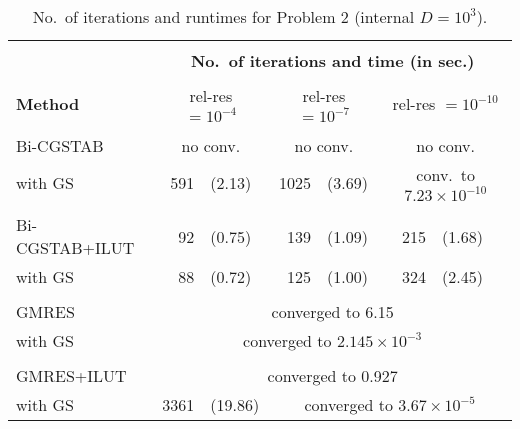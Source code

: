 \documentclass[12pt,a4paper]{article}
\newcounter{i}
\def\time{\!\times\!}
\def\noconv{\multicolumn{2}{|c|}{no conv.}}
\begin{document}
\begin{table}[!h]
\centering
\begin{tabular}{|l|rl|rl|rl|}
\hline
&\multicolumn{6}{|c|}{}\\[-12pt]
&\multicolumn{6}{|c|}{\bf No.\ of iterations and time (in sec.)}\\
\hline&&&&&&\\[-11pt]
{\bf Method} & \multicolumn{2}{|c|}{rel-res $=\!10^{-4}$}
& \multicolumn{2}{|c|}{rel-res $=\!10^{-7}$}
& \multicolumn{2}{|c|}{rel-res $=\!10^{-10}$} \\
\hline&&&&&&\\[-12pt]
Bi-CGSTAB       & \noconv      & \noconv       & \noconv       \\
with GS         & 591 & (2.13) & 1025 & (3.69) & 
\multicolumn{2}{|c|}{conv.\ to $7.23\time10^{-10}$} \\
\hline&&&&&&\\[-12pt]
Bi-CGSTAB+ILUT  & 92 & (0.75)  & 139 & (1.09)  & 215 & (1.68)  \\
with GS         & 88 & (0.72)  & 125 & (1.00)  & 324 & (2.45)  \\
\hline
&\multicolumn{6}{|c|}{}\\[-12pt]
GMRES & \multicolumn{6}{|c|}{converged to 6.15}  \\
with GS & \multicolumn{6}{|c|}{converged to $2.145\time10^{-3}$} \\
\hline
& \multicolumn{6}{|c|}{}\\[-12pt]
GMRES+ILUT & \multicolumn{6}{|c|}{converged to 0.927} \\
with GS & 3361 & (19.86) & 
\multicolumn{4}{|c|}{converged to $3.67\time10^{-5}$} \\
\hline
\end{tabular}
\caption{No.\ of iterations and runtimes for Problem 2 
(internal $D=10^3$).}
\label{tbl2}
\end{table}
\end{document}
